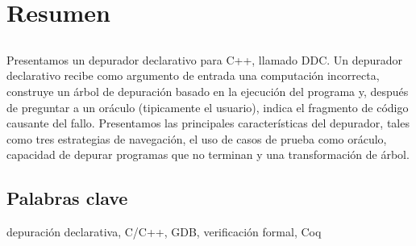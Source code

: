 \chapter*{Resumen}

\section*{\tituloPortadaVal}

Presentamos un depurador declarativo para C++, llamado DDC. Un depurador declarativo recibe como argumento de entrada una computación incorrecta, construye un árbol de depuración basado en la ejecución del programa y, después de preguntar a un oráculo (tipicamente el usuario), indica el fragmento de código causante del fallo. Presentamos las principales características del depurador, tales como tres estrategias de navegación, el uso de casos de prueba como oráculo, capacidad de depurar programas que no terminan y una transformación de árbol. 

\section*{Palabras clave}
   
\noindent depuración declarativa, C/C++, GDB, verificación formal, Coq

   



